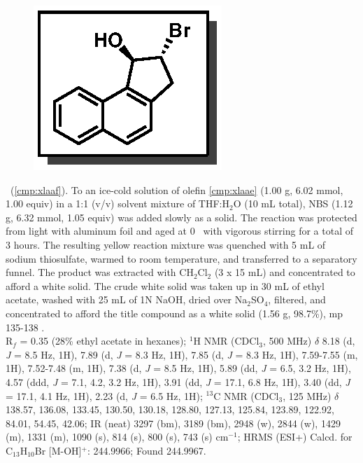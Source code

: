 \vspace{10pt}
\begin{figure}
  \vspace{-30pt}
  \begin{center}
    \includegraphics[scale=0.8]{chp_asymmetric/images/xlaaf}
  \end{center}
  \vspace{-30pt}
\end{figure}
\noindent \textbf{\CMPxlaaf}\ (\ref{cmp:xlaaf}). To an ice-cold solution of olefin
\ref{cmp:xlaae} (1.00 g, 6.02 mmol, 1.00 equiv) in a 1:1 (v/v) solvent
mixture of THF:H$_2$O (10 mL total), NBS (1.12 g, 6.32 mmol, 1.05 equiv) was added
slowly as a solid. The reaction was protected from light with aluminum foil and
aged at 0 \degc\  with vigorous stirring for a total of 3 hours. The resulting
yellow reaction mixture was quenched with 5 mL of sodium thiosulfate, warmed to room temperature, and transferred to a separatory funnel. 
The product was extracted with CH$_2$Cl$_2$ (3 x 15 mL) and concentrated to
afford a white solid. The crude white solid was taken up in 30 mL of ethyl
acetate, washed with 25 mL of 1N NaOH, dried over Na$_2$SO$_4$, filtered, and
concentrated to afford the title compound as a white solid (1.56 g, 98.7\%), mp
135-138 \degc. \\
R$_f$ = 0.35 (28\% ethyl acetate in hexanes); $^1$H NMR (CDCl$_3$, 500 MHz)
$\delta$ 8.18 (d, \textit{J} = 8.5 Hz, 1H), 7.89 (d, \textit{J} = 8.3 Hz, 1H),
7.85 (d, \textit{J} = 8.3 Hz, 1H), 7.59-7.55 (m, 1H), 7.52-7.48 (m, 1H), 7.38
(d, \textit{J} = 8.5 Hz, 1H), 5.89 (dd, \textit{J} = 6.5, 3.2 Hz, 1H), 4.57
(ddd, \textit{J} = 7.1, 4.2, 3.2 Hz, 1H), 3.91 (dd, \textit{J} = 17.1, 6.8 Hz,
1H), 3.40 (dd, \textit{J} = 17.1, 4.1 Hz, 1H), 2.23 (d, \textit{J} = 6.5 Hz,
1H); $^{13}$C NMR (CDCl$_3$, 125 MHz) $\delta$ 138.57, 136.08, 133.45, 130.50,
130.18, 128.80, 127.13, 125.84, 123.89, 122.92, 84.01, 54.45, 42.06; IR (neat) 3297 (bm), 3189 (bm), 2948 (w), 2844 (w), 1429 (m), 1331 (m), 1090 (s), 814 (s), 800 (s), 743 (s) cm$^{-1}$; HRMS (ESI+) Calcd. for C$_{13}$H$_{10}$Br [M-OH]$^+$: 244.9966; Found 244.9967.

